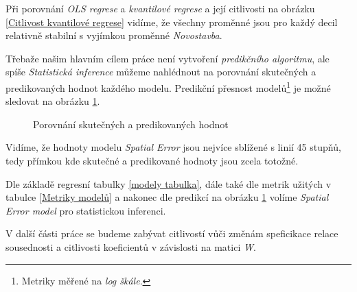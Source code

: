 \documentclass[11pt, a4paper]{article}
\begin{document}
Při porovnání \textit{OLS regrese} a \textit{kvantilové regrese} a její citlivosti na obrázku \ref{Citlivost kvantilové regrese} vidíme, že všechny proměnné jsou pro každý decil relativně stabilní s vyjímkou proměnné \textit{Novostavba}.

\clearpage

Třebaže našim hlavním cílem práce není vytvoření \textit{predikčního algoritmu}, ale spíše \textit{Statistická inference} můžeme nahlédnout na porovnání skutečných a predikovaných hodnot každého modelu. Predikční přesnost modelů\footnote{Metriky měřené na \textit{log škále}.} je možné sledovat na obrázku \ref{Porovnání skutečných a predikovaných hodnot}.

\begin{figure}[ht]
    \centering
        \noindent{}
    \caption{Porovnání skutečných a predikovaných hodnot}
    \label{Porovnání skutečných a predikovaných hodnot}
\end{figure}

Vidíme, že hodnoty modelu \textit{Spatial Error} jsou nejvíce sblížené s linií 45 stupňů, tedy přímkou kde skutečné a predikované hodnoty jsou zcela totožné.

Dle základě regresní tabulky \ref{modely tabulka}, dále také dle metrik užitých v tabulce \ref{Metriky modelů} a nakonec dle predikcí na obrázku \ref{Porovnání skutečných a predikovaných hodnot} volíme \textit{Spatial Error model} pro statistickou inferenci.

V další části práce se budeme zabývat citlivostí vůči změnám speficikace relace sousednosti a citlivosti koeficientů v závislosti na matici \textit{W}.
\clearpage
\end{document}
